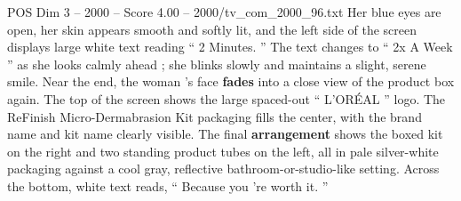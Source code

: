 \begin{textsample}{POS Dim 3 – 2000 – Score 4.00 – 2000/tv\_com\_2000\_96.txt}
Her blue eyes are open, her skin appears smooth and softly lit, and the left side of the screen displays large white text reading “ 2 Minutes. ” The text changes to “ 2x A Week ” as she looks calmly ahead ; she blinks slowly and maintains a slight, serene smile.
Near the end, the woman ’s face \textbf{fades} into a close view of the product box again.
The top of the screen shows the large spaced-out “ L’ORÉAL ” logo.
The ReFinish Micro-Dermabrasion Kit packaging fills the center, with the brand name and kit name clearly visible.
The final \textbf{arrangement} shows the boxed kit on the right and two standing product tubes on the left, all in pale silver-white packaging against a cool gray, reflective bathroom-or-studio-like setting.
Across the bottom, white text reads, “ Because you ’re worth it. ”

\end{textsample}
